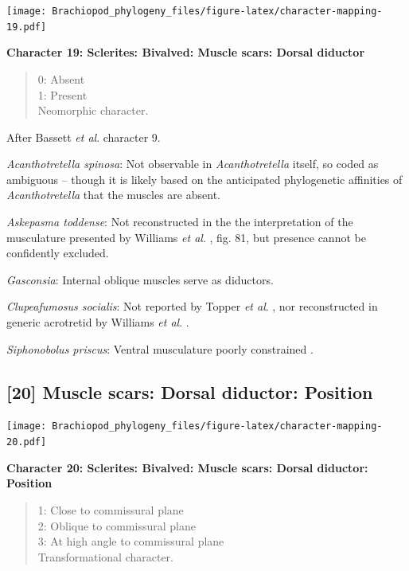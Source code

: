 \documentclass[]{book}
\theoremstyle{definition}
\theoremstyle{definition}
\theoremstyle{definition}
\theoremstyle{remark}
\begin{document}
\texttt{[image: Brachiopod\_phylogeny\_files/figure-latex/character-mapping-19.pdf]}

\textbf{Character 19: Sclerites: Bivalved: Muscle scars: Dorsal
diductor}

\begin{quote}
0: Absent\\
1: Present\\
Neomorphic character.
\end{quote}

After Bassett \emph{et al}.
\citeyearpar{Bassett2001Functionalmorphology} character 9.

\emph{Acanthotretella spinosa}: Not observable in \emph{Acanthotretella}
itself, so coded as ambiguous -- though it is likely based on the
anticipated phylogenetic affinities of \emph{Acanthotretella} that the
muscles are absent.

\emph{Askepasma toddense}: Not reconstructed in the the interpretation
of the musculature presented by Williams \emph{et al}.
\citeyearpar{Williams2000BrachiopodaLinguliformea}, fig. 81, but
presence cannot be confidently excluded.

\emph{Gasconsia}: Internal oblique muscles serve as diductors.

\emph{Clupeafumosus socialis}: Not reported by Topper \emph{et al}.
\citeyearpar{Topper2013Reappraisalof}, nor reconstructed in generic
acrotretid by Williams \emph{et al}.
\citeyearpar{Williams2000BrachiopodaLinguliformea}.

\emph{Siphonobolus priscus}: Ventral musculature poorly constrained
\citep{Williams2000BrachiopodaLinguliformea, Popov2009Earlyontogeny}.

\hypertarget{muscle-scars-dorsal-diductor-position}{%
\subsection*{{[}20{]} Muscle scars: Dorsal diductor:
Position}\label{muscle-scars-dorsal-diductor-position}}

\texttt{[image: Brachiopod\_phylogeny\_files/figure-latex/character-mapping-20.pdf]}

\textbf{Character 20: Sclerites: Bivalved: Muscle scars: Dorsal
diductor: Position}

\begin{quote}
1: Close to commissural plane\\
2: Oblique to commissural plane\\
3: At high angle to commissural plane\\
Transformational character.
\end{quote}
\end{document}
